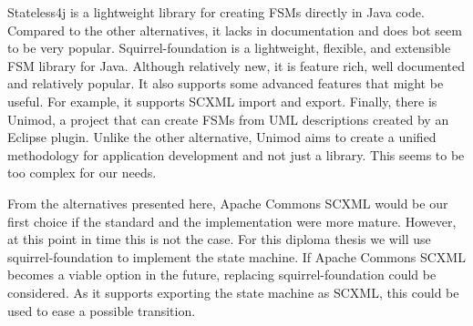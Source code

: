 Stateless4j is a lightweight library for creating FSMs directly in Java code.
Compared to the other alternatives, it lacks in documentation and does bot seem to be very popular.
Squirrel-foundation is a lightweight, flexible, and extensible FSM library for Java.
Although relatively new, it is feature rich, well documented and relatively popular.
It also supports some advanced features that might be useful.
For example, it supports SCXML import and export.
Finally, there is Unimod, a project that can create FSMs from UML descriptions created by an Eclipse plugin.
Unlike the other alternative, Unimod aims to create a unified methodology for application development and not just a library.
This seems to be too complex for our needs.

From the alternatives presented here, Apache Commons SCXML would be our first choice if the standard and the implementation were more mature.
However, at this point in time this is not the case.
For this diploma thesis we will use squirrel-foundation to implement the state machine.
If Apache Commons SCXML becomes a viable option in the future, replacing squirrel-foundation could be considered.
As it supports exporting the state machine as SCXML, this could be used to ease a possible transition.
